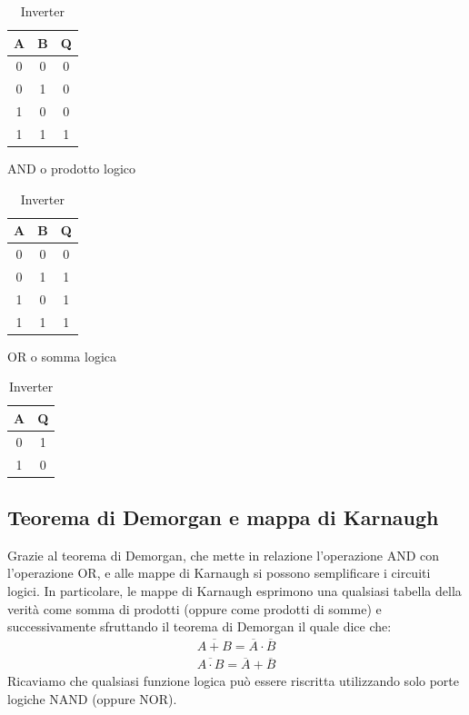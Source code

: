 \documentclass[a4paper,12pt]{article}
\begin{document}
\begin{table}[h]
	\parbox{.30\linewidth}{
		\centering
		\setlength{\tabcolsep}{10pt}
		\begin{tabular}{cc|c}
			\textbf{A} & \textbf{B} & \textbf{Q} \\
			\midrule
			0 & 0 & 0 \\
			0 & 1 & 0 \\
			1 & 0 & 0 \\
			1 & 1 & 1 \\
		\end{tabular}
		\caption{AND o prodotto logico}
	}
	\hfil
	\parbox{.30\linewidth}{
		\centering
		\setlength{\tabcolsep}{10pt}
		\begin{tabular}{cc|c}
			\textbf{A} & \textbf{B} & \textbf{Q} \\
			\midrule
			0 & 0 & 0 \\
			0 & 1 & 1 \\
			1 & 0 & 1 \\
			1 & 1 & 1 \\
		\end{tabular}
		\caption{OR o somma logica}
	}
	\hfil
	\parbox{.30\linewidth}{
		\centering
		\setlength{\tabcolsep}{10pt}
		\begin{tabular}{c|c}
			\textbf{A} & \textbf{Q} \\
			\midrule
			0 & 1 \\
			1 & 0 \\
		\end{tabular}
		\caption{Inverter}
		\label{tab:inverter-tabella-verita}
	}
\end{table}

\subsection*{Teorema di Demorgan e mappa di Karnaugh}
Grazie al teorema di Demorgan, che mette in relazione l'operazione AND con l'operazione OR, e alle mappe di Karnaugh si possono semplificare i circuiti logici. In particolare, le mappe di Karnaugh esprimono una qualsiasi tabella della verità come somma di prodotti (oppure come prodotti di somme) e successivamente sfruttando il teorema di Demorgan il quale dice che:
\begin{align*}
	\overline{A + B} = \overline{A} \cdot \overline{B}\\
	\overline{A \cdot B} = \overline{A} + \overline{B}
\end{align*}
Ricaviamo che qualsiasi funzione logica può essere riscritta utilizzando solo porte logiche NAND (oppure NOR). 
\end{document}
